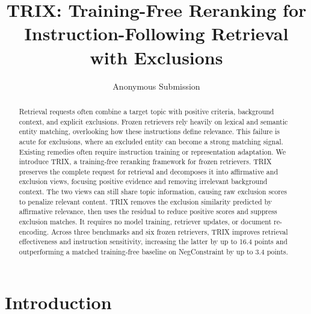 \documentclass[letterpaper]{article}
\title{TRIX: Training-Free Reranking for Instruction-Following Retrieval with Exclusions}
\author{
    Anonymous Submission
}
\newcommand{\method}{\ifmmode \mathrm{TRIX}\else TRIX\xspace\fi}
\begin{document}
\maketitle

\begin{abstract}
Retrieval requests often combine a target topic with positive criteria,
background context, and explicit exclusions.  Frozen retrievers rely heavily on
lexical and semantic entity matching, overlooking how these instructions
define relevance.  This failure is acute for exclusions, where an excluded
entity can become a strong matching signal.  Existing remedies often require
instruction training or representation adaptation.  We introduce \method{}, a
training-free reranking framework for frozen retrievers.  \method{} preserves
the complete request for retrieval and decomposes it into affirmative and
exclusion views, focusing positive evidence and removing irrelevant background
context.  The two views can still share topic information, causing raw
exclusion scores to penalize relevant content.  \method{} removes the exclusion
similarity predicted by affirmative relevance, then uses the residual to reduce
positive scores and suppress exclusion matches.  It requires no model
training, retriever updates, or document re-encoding.  Across three benchmarks
and six frozen retrievers, \method{} improves retrieval effectiveness and
instruction sensitivity, increasing the latter by up to 16.4 points and
outperforming a matched training-free baseline on NegConstraint by up to
3.4 points.
\end{abstract}

\section{Introduction}
\label{sec:introduction}
\end{document}
